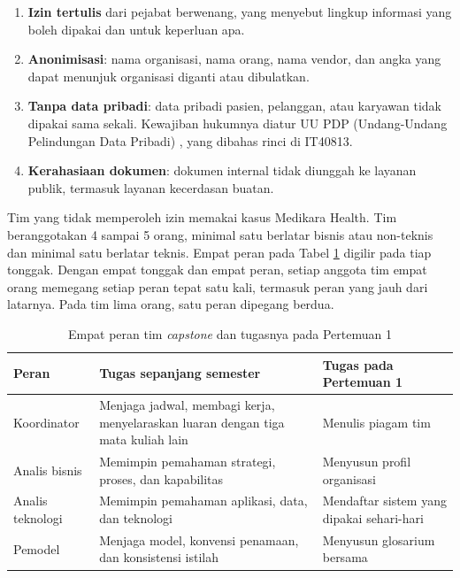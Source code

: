 \begin{enumerate}
  \item \textbf{Izin tertulis} dari pejabat berwenang, yang menyebut lingkup
        informasi yang boleh dipakai dan untuk keperluan apa.
  \item \textbf{Anonimisasi}: nama organisasi, nama orang, nama vendor, dan
        angka yang dapat menunjuk organisasi diganti atau dibulatkan.
  \item \textbf{Tanpa data pribadi}: data pribadi pasien, pelanggan, atau
        karyawan tidak dipakai sama sekali. Kewajiban hukumnya diatur UU PDP
        (Undang-Undang Pelindungan Data Pribadi) \cite{uu27-2022-pdp}, yang
        dibahas rinci di IT40813.
  \item \textbf{Kerahasiaan dokumen}: dokumen internal tidak diunggah ke
        layanan publik, termasuk layanan kecerdasan buatan.
\end{enumerate}

Tim yang tidak memperoleh izin memakai kasus Medikara Health. Tim
beranggotakan 4 sampai 5 orang, minimal satu berlatar bisnis atau non-teknis
dan minimal satu berlatar teknis. Empat peran pada Tabel \ref{tab:ch01-peran}
digilir pada tiap tonggak. Dengan empat tonggak dan empat peran, setiap
anggota tim empat orang memegang setiap peran tepat satu kali, termasuk peran
yang jauh dari latarnya. Pada tim lima orang, satu peran dipegang berdua.

\begin{table}[!htb]
  \centering
  \caption{Empat peran tim \textit{capstone} dan tugasnya pada Pertemuan 1}
  \label{tab:ch01-peran}
  \footnotesize
  \begin{tabularx}{\textwidth}{>{\raggedright\arraybackslash}p{2.2cm}
      >{\raggedright\arraybackslash}X >{\raggedright\arraybackslash}p{3.4cm}}
    \hline
    \textbf{Peran} & \textbf{Tugas sepanjang semester} & \textbf{Tugas pada Pertemuan 1} \\
    \hline
    Koordinator & Menjaga jadwal, membagi kerja, menyelaraskan luaran dengan tiga mata kuliah lain & Menulis piagam tim \\
    \hline
    Analis bisnis & Memimpin pemahaman strategi, proses, dan kapabilitas & Menyusun profil organisasi \\
    \hline
    Analis teknologi & Memimpin pemahaman aplikasi, data, dan teknologi & Mendaftar sistem yang dipakai sehari-hari \\
    \hline
    Pemodel & Menjaga model, konvensi penamaan, dan konsistensi istilah & Menyusun glosarium bersama \\
    \hline
  \end{tabularx}
\end{table}

